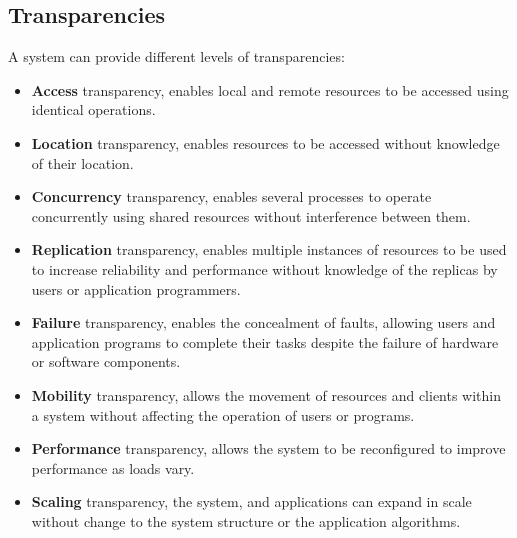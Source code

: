 \documentclass[11pt,a4paper]{article}
\begin{document}
\subsection{Transparencies}
A system can provide different levels of transparencies:
\begin{itemize}
    \item \textbf{Access} transparency, enables local and remote resources to be accessed using identical operations.
    \item \textbf{Location} transparency, enables resources to be accessed without knowledge of their location.
    \item \textbf{Concurrency} transparency, enables several processes to operate concurrently using shared resources without interference between them. 
    \item \textbf{Replication} transparency, enables multiple instances of resources to be used to increase reliability and performance without knowledge of the replicas by users or application programmers.
    \item \textbf{Failure} transparency, enables the concealment of faults, allowing users and application programs to complete their tasks despite the failure of hardware or software components.
    \item \textbf{Mobility} transparency, allows the movement of resources and clients within a system without affecting the operation of users or programs.
    \item \textbf{Performance} transparency, allows the system to be reconfigured to improve performance as loads vary.
    \item \textbf{Scaling} transparency, the system, and applications can expand in scale without change to the system structure or the application algorithms.
\end{itemize}
\end{document}
